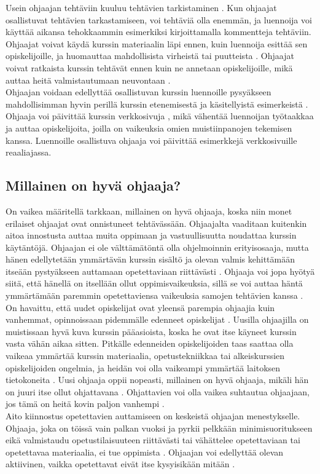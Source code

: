 \documentclass[finnish]{tktltiki2}
\theoremstyle{definition}
\theoremstyle{remark}
\begin{document}
Usein ohjaajan tehtäviin kuuluu tehtävien tarkistaminen \cite{Dickson11}. Kun ohjaajat osallistuvat tehtävien tarkastamiseen, voi tehtäviä olla enemmän, ja luennoija voi käyttää aikansa tehokkaammin esimerkiksi kirjoittamalla kommentteja tehtäviin. Ohjaajat voivat käydä kurssin materiaalin läpi ennen, kuin luennoija esittää sen opiskelijoille, ja huomauttaa mahdollisista virheistä tai puutteista \cite{Vikberg}. Ohjaajat voivat ratkaista kurssin tehtävät ennen kuin ne annetaan opiskelijoille, mikä auttaa heitä valmistautumaan neuvontaan \cite{Vihavainen}.
\\
Ohjaajan voidaan edellyttää osallistuvan kurssin luennoille pysyäkseen mahdollisimman hyvin perillä kurssin etenemisestä ja käsitellyistä esimerkeistä \cite{Reges03, Decker06}. Ohjaaja voi päivittää kurssin verkkosivuja \cite{Dickson11}, mikä vähentää luennoijan työtaakkaa ja auttaa opiskelijoita, joilla on vaikeuksia omien muistiinpanojen tekemisen kanssa. Luennoille osallistuva ohjaaja voi päivittää esimerkkejä verkkosivuille reaaliajassa.



\subsection{Millainen on hyvä ohjaaja?}
On vaikea määritellä tarkkaan, millainen on hyvä ohjaaja, koska niin monet erilaiset ohjaajat ovat onnistuneet tehtävässään. Ohjaajalta vaaditaan kuitenkin aitoa innostusta auttaa muita oppimaan ja vastuullisuutta noudattaa kurssin käytäntöjä. Ohjaajan ei ole välttämätöntä olla ohjelmoinnin erityisosaaja, mutta hänen edellytetään ymmärtävän kurssin sisältö ja olevan valmis kehittämään itseään pystyäkseen auttamaan opetettaviaan riittävästi \cite{Reges88}. Ohjaaja voi jopa hyötyä siitä, että hänellä on itsellään ollut oppimisvaikeuksia, sillä se voi auttaa häntä ymmärtämään paremmin opetettaviensa vaikeuksia samojen tehtävien kanssa \cite{Decker06}.
\\
On havaittu, että uudet opiskelijat ovat yleensä parempia ohjaajia kuin vanhemmat, opinnoissaan pidemmälle edenneet opiskelijat \cite{Dickson11}. Uusilla ohjaajilla on muistissaan hyvä kuva kurssin pääasioista, koska he ovat itse käyneet kurssin vasta vähän aikaa sitten. Pitkälle edenneiden opiskelijoiden taas saattaa olla vaikeaa ymmärtää kurssin materiaalia, opetustekniikkaa tai alkeiskurssien opiskelijoiden ongelmia, ja heidän voi olla vaikeampi ymmärtää laitoksen tietokoneita \cite{Reges88}. Uusi ohjaaja oppii nopeasti, millainen on hyvä ohjaaja, mikäli hän on juuri itse ollut ohjattavana \cite{Vihavainen, Vikberg}. Ohjattavien voi olla vaikea suhtautua ohjaajaan, jos tämä on heitä kovin paljon vanhempi \cite{Decker06}.
\\
Aito kiinnostus opetettavien auttamiseen on keskeistä ohjaajan menestykselle. Ohjaaja, joka on töissä vain palkan vuoksi ja pyrkii pelkkään minimisuoritukseen eikä valmistaudu opetustilaisuuteen riittävästi tai vähättelee opetettaviaan tai opetettavaa materiaalia, ei tue oppimista \cite{Richards00}. Ohjaajan voi edellyttää olevan aktiivinen, vaikka opetettavat eivät itse kysyisikään mitään \cite{Vikberg}.
\end{document}
